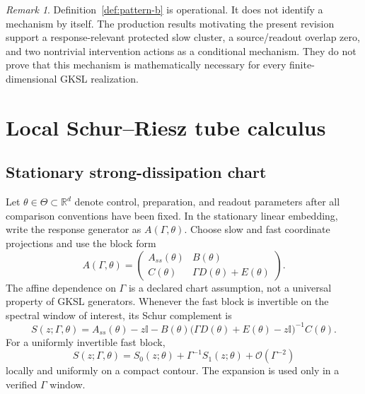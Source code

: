 \documentclass[11pt]{article}
\theoremstyle{definition}
\theoremstyle{remark}
\newtheorem{remark}[theorem]{Remark}
\newcommand{\id}{\mathbb I}
\newcommand{\RR}{\mathbb R}
\begin{document}
\begin{remark}
Definition~\ref{def:pattern-b} is operational. It does not identify a mechanism by itself. The production results motivating the present revision support a response-relevant protected slow cluster, a source/readout overlap zero, and two nontrivial intervention actions as a conditional mechanism. They do not prove that this mechanism is mathematically necessary for every finite-dimensional GKSL realization.
\end{remark}

\section{Local Schur--Riesz tube calculus}\label{sec:tube-calculus}

\subsection{Stationary strong-dissipation chart}

Let $\theta\in\Theta\subset\RR^d$ denote control, preparation, and readout parameters after all comparison conventions have been fixed. In the stationary linear embedding, write the response generator as $A(\Gamma,\theta)$. Choose slow and fast coordinate projections and use the block form
\begin{equation}
A(\Gamma,\theta)
=
\begin{pmatrix}
A_{ss}(\theta) & B(\theta)\\
C(\theta) & \Gamma D(\theta)+E(\theta)
\end{pmatrix}.
\label{eq:slow-fast-block}
\end{equation}
The affine dependence on $\Gamma$ is a declared chart assumption, not a universal property of GKSL generators. Whenever the fast block is invertible on the spectral window of interest, its Schur complement is
\begin{equation}
S(z;\Gamma,\theta)
=
A_{ss}(\theta)-z\id
-B(\theta)
\bigl(\Gamma D(\theta)+E(\theta)-z\id\bigr)^{-1}
C(\theta).
\label{eq:schur-complement}
\end{equation}
For a uniformly invertible fast block,
\begin{equation}
S(z;\Gamma,\theta)
=
S_0(z;\theta)
+\Gamma^{-1}S_1(z;\theta)
+\mathcal O(\Gamma^{-2})
\label{eq:schur-expansion}
\end{equation}
locally and uniformly on a compact contour. The expansion is used only in a verified $\Gamma$ window.
\end{document}
